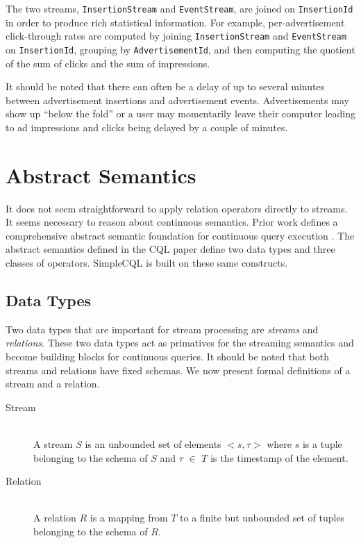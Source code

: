 \documentclass[a4paper, 10pt, conference]{IEEEconf}
\begin{document}
The two streams, \texttt{InsertionStream} and \texttt{EventStream}, are joined on \texttt{InsertionId} in order to produce rich statistical information.  For example, per-advertisement click-through rates are computed by joining \texttt{InsertionStream} and \texttt{EventStream} on \texttt{InsertionId}, grouping by \texttt{AdvertisementId}, and then computing the quotient of the sum of clicks and the sum of impressions.

It should be noted that there can often be a delay of up to several minutes between advertisement insertions and advertisement events.  Advertisements may show up ``below the fold'' or a user may momentarily leave their computer leading to ad impressions and clicks being delayed by a couple of minutes.

\section{Abstract Semantics}
It does not seem straightforward to apply relation operators directly to streams.  It seems necessary to reason about continuous semantics.  Prior work defines a comprehensive abstract semantic foundation for continuous query execution \cite{cql}.  The abstract semantics defined in the CQL paper define two data types and three classes of operators.  SimpleCQL is built on these same constructs.

\subsection{Data Types}
Two data types that are important for stream processing are \textit{streams} and \textit{relations}.  These two data types act as primatives for the streaming semantics and become building blocks for continuous queries.  It should be noted that both streams and relations have fixed schemas. We now present formal definitions of a stream and a relation.

\begin{description}
  \item[Stream] \hfill \\
  A stream $S$ is an unbounded set of elements $<s, \tau>$ where $s$ is a tuple belonging to the schema of $S$ and $\tau$ $\in$ $T$ is the timestamp of the element.
  
  \item[Relation] \hfill \\
  A relation $R$ is a mapping from $T$ to a finite but unbounded set of tuples belonging to the schema of $R$.
\end{description}
\end{document}
